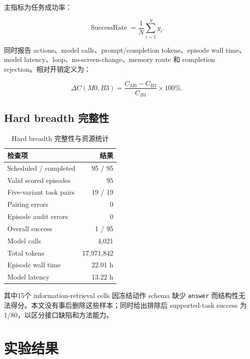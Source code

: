 \documentclass[12pt,a4paper]{ctexart}
\newcommand{\code}[1]{\texttt{#1}}
\begin{document}
主指标为任务成功率：

\begin{equation}
    \operatorname{SuccessRate}=\frac{1}{N}\sum_{i=1}^{N}y_i.
\end{equation}

同时报告 actions、model calls、prompt/completion tokens、episode wall time、model latency、loop、no-screen-change、memory route 和 completion rejection。相对开销定义为：

\begin{equation}
    \Delta C(M0,B3)=\frac{C_{M0}-C_{B3}}{C_{B3}}\times100\%.
\end{equation}

\subsection{Hard breadth 完整性}

\begin{table}[H]
    \centering
    \caption{Hard breadth 完整性与资源统计}
    \label{tab:hard-integrity}
    \small
    \begin{tabularx}{\textwidth}{Y r}
        \toprule
        检查项 & 结果 \\
        \midrule
        Scheduled / completed & 95 / 95 \\
        Valid scored episodes & 95 \\
        Five-variant task pairs & 19 / 19 \\
        Pairing errors & 0 \\
        Episode audit errors & 0 \\
        Overall success & 1 / 95 \\
        Model calls & 4,021 \\
        Total tokens & 17,971,842 \\
        Episode wall time & 22.01 h \\
        Model latency & 13.22 h \\
        \bottomrule
    \end{tabularx}
\end{table}

其中15个 information-retrieval cells 因冻结动作 schema 缺少 \code{answer} 而结构性无法得分。本文没有事后删除这些样本；同时给出排除后 supported-task success 为 1/80，以区分接口缺陷和方法能力。

\section{实验结果}
\end{document}
